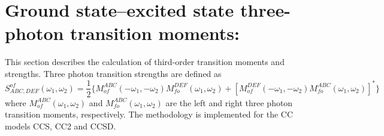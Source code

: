 
\section{Ground state--excited state three-photon 
transition moments: }\label{sec:cctm}

This section describes the calculation of third-order transition
moments and strengths. Three photon transition strengths are defined as
{\small \[
S^{of}_{ABC,DEF}(\omega_1,\omega_2) = \frac{1}{2} 
       \{ M^{ABC}_{of}(-\omega_1,-\omega_2) M^{DEF}_{fo}(\omega_1,\omega_2)
        +[M^{DEF}_{of}(-\omega_1,-\omega_2) M^{ABC}_{fo}(\omega_1,\omega_2)]^\ast\}
\] }
where $M^{ABC}_{of}(\omega_1,\omega_2)$ and $M^{ABC}_{fo}(\omega_1,\omega_2)$
are the left and right three photon transition moments, respectively.
The methodology is implemented for the CC models CCS, CC2 and CCSD.

\begin{center}
\end{center}


